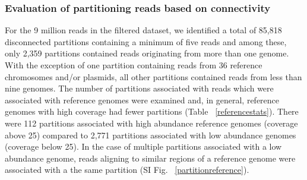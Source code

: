 \documentclass[11pt]{article} %
\begin{document}
\subsubsection{Evaluation of partitioning reads based on connectivity}
For the 9 million reads in the filtered dataset, we identified a total of 85,818 disconnected partitions containing a minimum of five reads and among these, only 2,359 partitions contained reads originating from more than one genome.  With the exception of one partition containing reads from 36 reference chromosomes and/or plasmids, all other partitions contained reads from less than nine genomes.  The number of partitions associated with reads which were associated with reference genomes were examined and, in general, reference genomes with high coverage had fewer partitions (Table ~\ref{referencestats}).  There were 112 partitions associated with high abundance reference genomes (coverage above 25) compared to 2,771 partitions associated with low abundance genomes (coverage below 25).  In the case of multiple partitions associated with a low abundance genome, reads aligning to similar regions of a reference genome were associated with a the same partition (SI Fig. ~\ref{partitionreference}).
\end{document}
